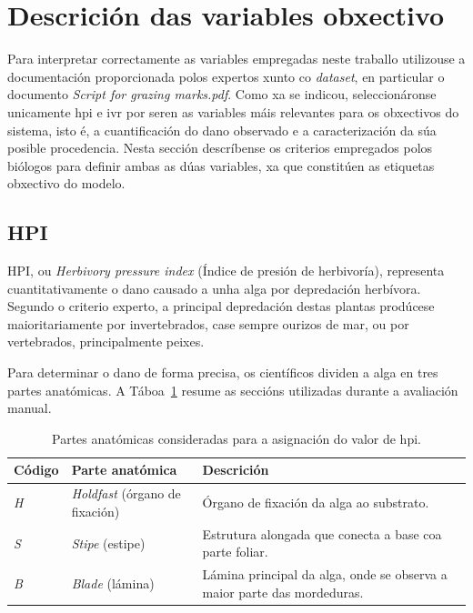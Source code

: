 \section{Descrición das variables obxectivo}
\label{sec:descricion-variables-obxectivo}
Para interpretar correctamente as variables empregadas neste traballo utilizouse a documentación
proporcionada polos expertos xunto co \textit{dataset}, en particular o documento \textit{Script for
grazing marks.pdf}. Como xa se indicou, seleccionáronse unicamente \gls{hpi} e \gls{ivr} por seren as
variables máis relevantes para os obxectivos do sistema, isto é, a cuantificación do dano observado e
a caracterización da súa posible procedencia. Nesta sección descríbense os criterios empregados polos
biólogos para definir ambas as dúas variables, xa que constitúen as etiquetas obxectivo do modelo.

\subsection{HPI}
HPI, ou \textit{Herbivory pressure index} (Índice de presión de herbivoría), representa cuantitativamente
o dano causado a unha alga por depredación herbívora. Segundo o criterio experto, a principal
depredación destas plantas prodúcese maioritariamente por invertebrados, case sempre ourizos de mar,
ou por vertebrados, principalmente peixes.

Para determinar o dano de forma precisa, os científicos dividen a alga en tres partes anatómicas. A
Táboa~\ref{tab:partes-hpi} resume as seccións utilizadas durante a avaliación manual.

{
\begin{table}[htbp]
  \centering
  \begin{tabular}{p{}|p{}|p{}}
  \rowcolor{udcpink!25}
  \textbf{Código} & \textbf{Parte anatómica} & \textbf{Descrición} \\\hline
  \textit{H} & \textit{Holdfast} (órgano de fixación) & Órgano de fixación da alga ao substrato. \\
  \textit{S} & \textit{Stipe} (estipe) & Estrutura alongada que conecta a base coa parte foliar. \\
  \textit{B} & \textit{Blade} (lámina) & Lámina principal da alga, onde se observa a maior parte das mordeduras. \\
  \end{tabular}
  \caption{Partes anatómicas consideradas para a asignación do valor de \gls{hpi}.}
  \label{tab:partes-hpi}
\end{table}
}

